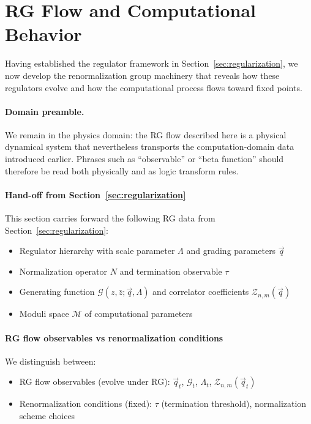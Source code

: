 \section{RG Flow and Computational Behavior}
\label{sec:rg-flow}

Having established the regulator framework in Section~\ref{sec:regularization}, we now develop the renormalization group machinery that reveals how these regulators evolve and how the computational process flows toward fixed points.

\paragraph{Domain preamble.} We remain in the physics domain: the RG flow described here is a physical dynamical system that nevertheless transports the computation-domain data introduced earlier. Phrases such as ``observable'' or ``beta function'' should therefore be read both physically and as logic transform rules.

\paragraph{Hand-off from Section~\ref{sec:regularization}}
This section carries forward the following RG data from Section~\ref{sec:regularization}:
\begin{itemize}
\item Regulator hierarchy with scale parameter $\Lambda$ and grading parameters $\vec{q}$
\item Normalization operator $N$ and termination observable $\tau$
\item Generating function $\mathcal{G}(z,\bar{z};\vec{q},\Lambda)$ and correlator coefficients $\mathcal{Z}_{n,m}(\vec{q})$
\item Moduli space $\mathcal{M}$ of computational parameters
\end{itemize}

\paragraph{RG flow observables vs renormalization conditions}
We distinguish between:
\begin{itemize}
\item RG flow observables (evolve under RG): $\vec{q}_t$, $\mathcal{G}_t$, $\Lambda_t$, $\mathcal{Z}_{n,m}(\vec{q}_t)$
\item Renormalization conditions (fixed): $\tau$ (termination threshold), normalization scheme choices
\end{itemize}

